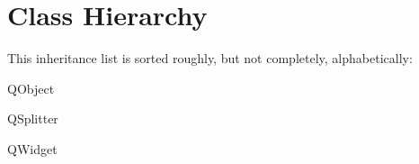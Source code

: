 \section{Class Hierarchy}
This inheritance list is sorted roughly, but not completely, alphabetically\+:\begin{DoxyCompactList}
\item Q\+Object\begin{DoxyCompactList}
\item {}
\end{DoxyCompactList}
\item Q\+Splitter\begin{DoxyCompactList}
\item {}
\item {}
\end{DoxyCompactList}
\item Q\+Widget\begin{DoxyCompactList}
\item {}
\end{DoxyCompactList}
\item {}
\end{DoxyCompactList}
